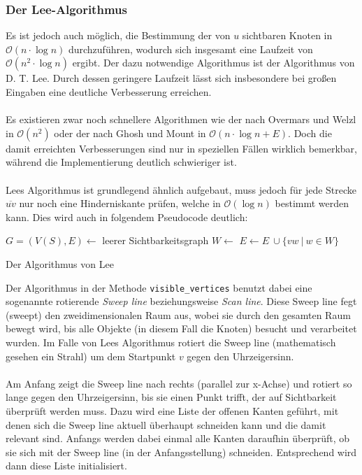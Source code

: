 \documentclass[a4paper, notitlepage, 12pt]{scrartcl}
\begin{document}
 \subsubsection{Der Lee-Algorithmus}
 Es ist jedoch auch möglich, die Bestimmung der von $u$ sichtbaren Knoten in $\mathcal{O}(n \cdot \log n)$ durchzuführen, wodurch sich insgesamt eine Laufzeit von $\mathcal{O}(n^2 \cdot \log n)$ ergibt. Der dazu notwendige Algorithmus ist der Algorithmus von D. T. Lee. Durch dessen geringere Laufzeit lässt sich insbesondere bei großen Eingaben eine deutliche Verbesserung erreichen. \\ \\
 Es existieren zwar noch schnellere Algorithmen wie der nach Overmars und Welzl in $\mathcal{O}(n^2)$ oder der nach Ghosh und Mount in $\mathcal{O}(n \cdot \log n + E)$\cite{Src:kitz}. Doch die damit erreichten Verbesserungen sind nur in speziellen Fällen wirklich bemerkbar, während die Implementierung deutlich schwieriger ist. \\ \\
 Lees Algorithmus ist grundlegend ähnlich aufgebaut, muss jedoch für jede Strecke $\overline{uv}$ nur noch eine Hinderniskante prüfen, welche in $\mathcal{O}(\log n)$ bestimmt werden kann. Dies wird auch in folgendem Pseudocode deutlich:
 \begin{algorithm}[H]
 \begin{algorithmic}
 	\State $G = (V(S),E) \gets$ leerer Sichtbarkeitsgraph
 	\State $W \gets$ 
 	\State $E \gets E~ \cup \{vw~|~w \in W \}$
 	\EndFor
 	\EndFunction
 \end{algorithmic}
 \caption{Der Algorithmus von Lee}
 \end{algorithm}
 Der Algorithmus in der Methode \texttt{visible\_vertices} benutzt dabei eine sogenannte rotierende \emph{Sweep line} beziehungsweise \emph{Scan line}. Diese Sweep line fegt (\glqq sweept\grqq) den zweidimensionalen Raum aus, wobei sie durch den gesamten Raum bewegt wird, bis alle Objekte (in diesem Fall die Knoten) besucht und verarbeitet wurden. Im Falle von Lees Algorithmus rotiert die Sweep line (mathematisch gesehen ein Strahl) um dem Startpunkt $v$ gegen den Uhrzeigersinn. \\ \\
 Am Anfang zeigt die Sweep line nach rechts (parallel zur x-Achse) und rotiert so lange gegen den Uhrzeigersinn, bis sie einen Punkt trifft, der auf Sichtbarkeit überprüft werden muss. Dazu wird eine Liste der offenen Kanten geführt, mit denen sich die Sweep line aktuell überhaupt schneiden kann und die damit relevant sind.\cite{Src:pyvistwo} Anfangs werden dabei einmal alle Kanten daraufhin überprüft, ob sie sich mit der Sweep line (in der Anfangsstellung) schneiden. Entsprechend wird dann diese Liste initialisiert. \\ \\
\end{document}

